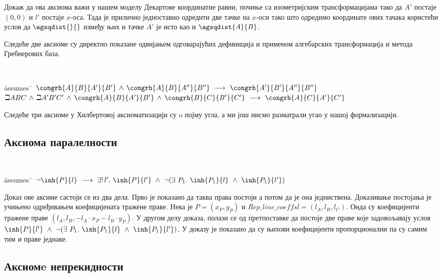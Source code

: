 Докаж да ова аксиома важи у нашем моделу Декартове координатне равни,
почиње са изометријским трансформацијама тако да $A'$ постаје $(0, 0)$
и $l'$ постаје $x$-оса. Тада је прилично једноставно одредити две
тачке на $x$-оси тако што одредимо координате ових тачака користећи
услов да $\agsqdist{}{}$ између њих и тачке $A'$ је исто као и
$\agsqdist{A}{B}$.

Следеће две аксиоме су директно показане одвијањем одговарајућих
дефиниција и применом алгебарских трансформација и метода Гребнерових
база.

{\tt
\begin{tabbing}
\hspace{5mm}\=assumes\ \=\kill
$\congrh{A}{B}{A'}{B'}\,\wedge\,\congrh{A}{B}{A''}{B''}\ \longrightarrow\ \congrh{A'}{B'}{A''}{B''}$\\
$\beth{A}{B}{C}\,\wedge\,\beth{A'}{B'}{C'}\,\wedge\,\congrh{A}{B}{A'}{B'}\,\wedge\,\congrh{B}{C}{B'}{C'} \ \longrightarrow\ \congrh{A}{C}{A'}{C'}$
\end{tabbing}
}

Следеће три аксиоме у Хилбертовој аксиоматизацији су o појму угла, а
ми још нисмо разматрали угао у нашој формализацији.

\subsection{Аксиома паралелности}

{\tt
\begin{tabbing}
\hspace{5mm}\=assumes\ \=\kill
$\neg \inh{P}{l} \ \longrightarrow\ \exists!\,l'.\ \inh{P}{l'}\ \wedge\ \neg (\exists\ P_1.\ \inh{P_1}{l}\ \wedge\  \inh{P_1}{l'})$
\end{tabbing}
}

Доказ ове аксиме састоји се из два дела. Прво је показано да таква
права постоји а потом да је она једниствена. Доказивање постојања је
учињено одређивањем коефицијената тражене праве. Нека је $P = (x_P,
y_P)$ и $\mathit{Rep\_line\_coeffs} l = (l_A, l_B, l_C)$. Онда су
коефицијенти тражене праве $(l_A, l_B, -l_A\cdot x_P - l_B\cdot
y_P)$. У другом делу доказа, полази се од претпоставке да постоје две
праве које задовољавају услов $\inh{P}{l'}\ \wedge\ \neg
(\exists\ P_1.\ \inh{P_1}{l}\ \wedge\ \inh{P_1}{l'})$. У доказу је
показано да су њихови коефицијенти пропорционални па су самим тим и
праве једнаке.

\subsection{Аксиомe непрекидности}

